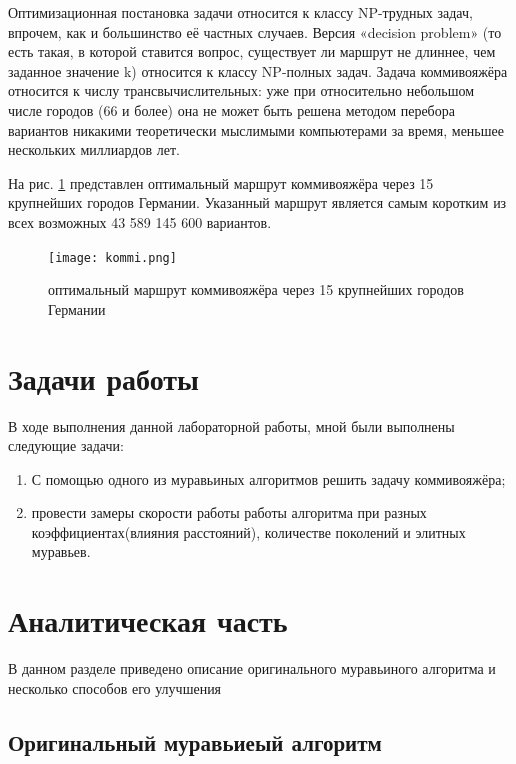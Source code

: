 \documentclass[a4paper, 14pt]{article}
\begin{document}
Оптимизационная постановка задачи относится к классу NP-трудных задач, впрочем, как и большинство её частных случаев. Версия «decision problem» (то есть такая, в которой ставится вопрос, существует ли маршрут не длиннее, чем заданное значение k) относится к классу NP-полных задач. Задача коммивояжёра относится к числу трансвычислительных: уже при относительно небольшом числе городов (66 и более) она не может быть решена методом перебора вариантов никакими теоретически мыслимыми компьютерами за время, меньшее нескольких миллиардов лет.

На рис. \ref{ris:kommi} представлен оптимальный маршрут коммивояжёра через 15 крупнейших городов Германии. Указанный маршрут является самым коротким из всех возможных 43 589 145 600 вариантов.

\begin{figure}[h]
\center
\texttt{[image: kommi.png]}
\caption{оптимальный маршрут коммивояжёра через 15 крупнейших городов Германии}
\label{ris:kommi}
\end{figure}


\newpage
\section*{Задачи работы}

В ходе выполнения данной лабораторной работы, мной были выполнены следующие задачи:

\begin{enumerate}
\item[1)] С помощью одного из муравьиных алгоритмов решить задачу коммивояжёра;
\item[2)] провести замеры скорости работы работы алгоритма при разных коэффициентах(влияния расстояний), количестве поколений и элитных муравьев.
\end{enumerate}


\newpage
\section{Аналитическая часть}
\hspace{1cm}	В данном разделе приведено описание оригинального муравьиного алгоритма и несколько способов его улучшения

\subsection {Оригинальный муравьиеый алгоритм} \\
\end{document}
